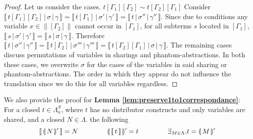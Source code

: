 \documentclass[a4paper,UKenglish,cleveref, autoref]{lipics-v2019}
\newcommand{\FALC}{\Lambda^{S}_{a}}
\newcommand{\readback}[2]{\llbracket \, #1 \, \rrbracket}
\newcommand{\compile}[1]{\llparenthesis \, #1 \, \rrparenthesis}
\newcommand{\readbackwmap}[3]{\llbracket \, #1 \, \vert \, #2 \, \vert \, #3  \, \rrbracket }
\newcommand{\bindvars}[1]{\parallel#1\parallel}
\begin{document}
\begin{proof}
Let us consider the cases.
\newline
\newline
$t[\Gamma_{1}][\Gamma_{2}] \sim t[\Gamma_{2}][\Gamma_{1}]$
\newline
Consider $\readbackwmap{t[\Gamma_{1}][\Gamma_{2}]}{\sigma}{\gamma} = \readbackwmap{t[\Gamma_{1}]}{\sigma'}{\gamma'} = \readbackwmap{t}{\sigma''}{\gamma''}$. Since due to conditions any variable $x \in \bindvars{[\Gamma_{2}]}$ cannot occur in $[\Gamma_{1}]$, for all subterms $s$ located in $[\Gamma_{1}]$, $\readbackwmap{s}{\sigma'}{\gamma'} = \readbackwmap{s}{\sigma}{\gamma}$. Therefore $\readbackwmap{t}{\sigma''}{\gamma''} = \readbackwmap{t[\Gamma_{2}]}{\sigma'''}{\gamma'''} = \readbackwmap{t[\Gamma_{2}][\Gamma_{1}]}{\sigma}{\gamma}$.
\newline
\newline
The remaining cases discuss permutations of variables in sharings and phantom-abstractions. In both these cases, we overwrite $\sigma$ for the cases of the variables in said sharing or phantom-abstractions. The order in which they appear do not influence the translation since we do this for all variables regardless.
\end{proof}

\noindent We also provide the proof for {\bf Lemma \ref{lem:preserve1to1correspondance}}: For a closed $t \in \FALC$, where $t$ has no distributor constructs and only variables are shared, and a closed $N \in \Lambda$. the following
$$\readback{\compile{N}'}{I} = N \hspace{1.5cm} \compile{\readback{t}{I}}' = t \hspace{1.5cm} \exists_{ M \in \Lambda} . t = \compile{M}'$$
\end{document}
